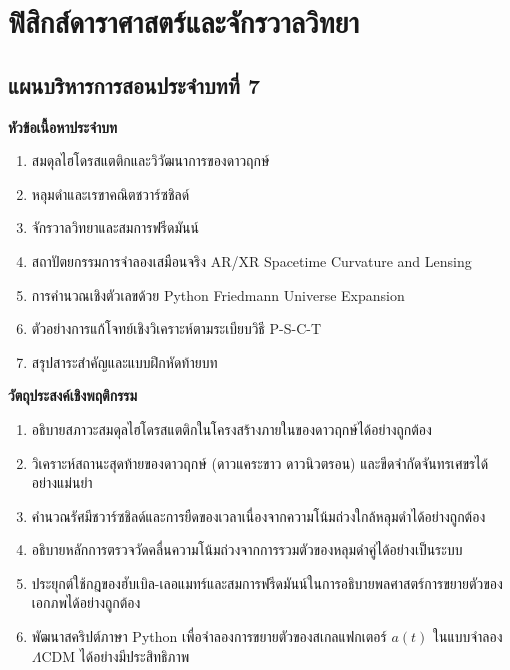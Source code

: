 \chapter{ฟิสิกส์ดาราศาสตร์และจักรวาลวิทยา}
\label{chap:astrophysics}

\section*{แผนบริหารการสอนประจำบทที่ 7}


\begin{lessonplanbox}
\noindent\textbf{หัวข้อเนื้อหาประจำบท}
\begin{enumerate}
    \item สมดุลไฮโดรสแตติกและวิวัฒนาการของดาวฤกษ์
    \item หลุมดำและเรขาคณิตชวาร์ซชิลด์
    \item จักรวาลวิทยาและสมการฟรีดมันน์
    \item สถาปัตยกรรมการจำลองเสมือนจริง AR/XR Spacetime Curvature and Lensing
    \item การคำนวณเชิงตัวเลขด้วย Python Friedmann Universe Expansion
    \item ตัวอย่างการแก้โจทย์เชิงวิเคราะห์ตามระเบียบวิธี P-S-C-T
    \item สรุปสาระสำคัญและแบบฝึกหัดท้ายบท
\end{enumerate}

\noindent\textbf{วัตถุประสงค์เชิงพฤติกรรม}
\begin{enumerate}
    \item อธิบายสภาวะสมดุลไฮโดรสแตติกในโครงสร้างภายในของดาวฤกษ์ได้อย่างถูกต้อง
    \item วิเคราะห์สถานะสุดท้ายของดาวฤกษ์ (ดาวแคระขาว ดาวนิวตรอน) และขีดจำกัดจันทรเศขรได้อย่างแม่นยำ
    \item คำนวณรัศมีชวาร์ซชิลด์และการยืดของเวลาเนื่องจากความโน้มถ่วงใกล้หลุมดำได้อย่างถูกต้อง
    \item อธิบายหลักการตรวจวัดคลื่นความโน้มถ่วงจากการรวมตัวของหลุมดำคู่ได้อย่างเป็นระบบ
    \item ประยุกต์ใช้กฎของฮับเบิล-เลอแมทร์และสมการฟรีดมันน์ในการอธิบายพลศาสตร์การขยายตัวของเอกภพได้อย่างถูกต้อง
    \item พัฒนาสคริปต์ภาษา Python เพื่อจำลองการขยายตัวของสเกลแฟกเตอร์ $a(t)$ ในแบบจำลอง $\Lambda\text{CDM}$ ได้อย่างมีประสิทธิภาพ
\end{enumerate}


\end{lessonplanbox}
